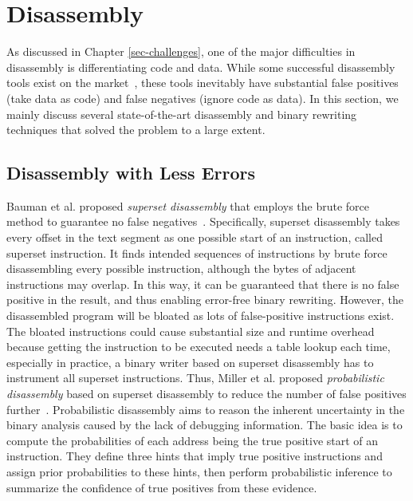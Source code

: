 \section{Disassembly} \label{sec:existing-disassembly}
As discussed in Chapter \ref{sec-challenges}, one of the major difficulties in
disassembly is differentiating code and data. While some successful disassembly
tools exist on the market~\cite{hex2014ida,kvroustek2017retdec,ghidra,radare},
these tools inevitably have substantial false positives (take data as code) and
false negatives (ignore code as data). In this section, we mainly discuss
several state-of-the-art disassembly and binary rewriting techniques that
solved the problem to a large extent.

\subsection{Disassembly with Less Errors} \label{sec:existing-less-errors}
Bauman et al. proposed \textit{superset disassembly} that employs the brute force method to guarantee no false negatives~\cite{bauman2018superset}. Specifically, superset disassembly takes every offset in the text segment as one possible start of an instruction, called superset instruction. It finds intended sequences of instructions by brute force disassembling every possible instruction, although the bytes of adjacent instructions may overlap.
%
In this way, it can be guaranteed that there is no false positive in the result, and thus enabling error-free binary rewriting. However, the disassembled program will be bloated as lots of false-positive instructions exist. The bloated instructions could cause substantial size and runtime overhead because getting the instruction to be executed needs a table lookup each time, especially in practice, a binary writer based on superset disassembly has to instrument all superset instructions.
Thus, Miller et al. proposed \textit{probabilistic disassembly} based on superset disassembly to reduce the number of false positives further~\cite{miller2019probabilistic}. Probabilistic disassembly aims to reason the inherent uncertainty in the binary analysis caused by the lack of debugging information. The basic idea is to compute the probabilities of each address being the true positive start of an instruction. They define three hints that imply true positive instructions and assign prior probabilities to these hints, then perform probabilistic inference to summarize the confidence of true positives from these evidence.


